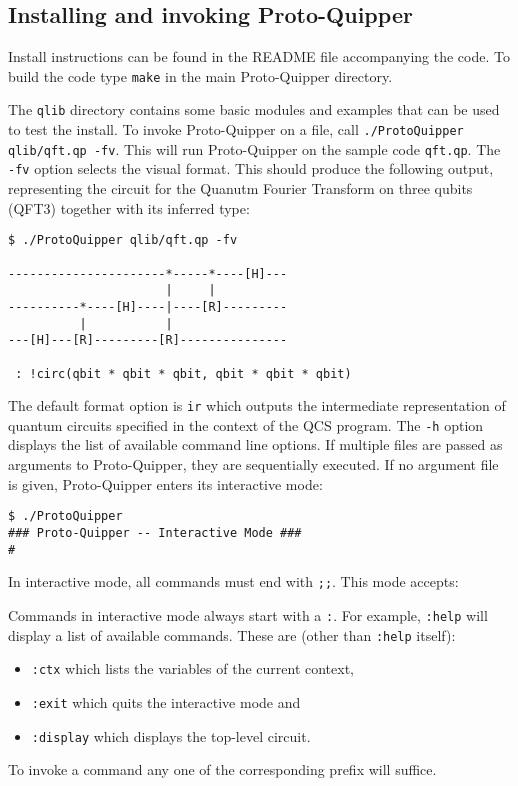 \subsection{Installing and invoking Proto-Quipper}

Install instructions can be found in the README file accompanying the code. 
To build the code type \verb#make# in the main Proto-Quipper directory. 

The \verb#qlib# directory contains some basic modules and examples that can 
be used to test the install. To invoke Proto-Quipper on a file, call 
\verb#./ProtoQuipper qlib/qft.qp -fv#. This will run Proto-Quipper on the sample code \verb#qft.qp#. The \verb#-fv# option selects the visual format. 
This should produce the following output, representing the circuit for the 
Quanutm Fourier Transform on three qubits (QFT3) together with its inferred 
type:
\begin{verbatim}
$ ./ProtoQuipper qlib/qft.qp -fv

----------------------*-----*----[H]---
                      |     |          
----------*----[H]----|----[R]---------
          |           |                
---[H]---[R]---------[R]---------------

 : !circ(qbit * qbit * qbit, qbit * qbit * qbit)
\end{verbatim}
The default format option is \verb#ir# which outputs the intermediate representation of quantum circuits specified in the context of the QCS program. The \verb#-h# option displays the list of available command line 
options. If multiple files are passed as arguments to Proto-Quipper, they 
are sequentially executed. If no argument file is given, Proto-Quipper 
enters its interactive mode:
\begin{verbatim}
$ ./ProtoQuipper
### Proto-Quipper -- Interactive Mode ###
# 
\end{verbatim}
In interactive mode, all commands must end with \verb#;;#. This mode accepts:
Commands in interactive mode always start with a \verb#:#. For example, 
\verb#:help# will display a list of available commands. These are (other 
than \verb#:help# itself): 
\begin{itemize}
  \item \verb#:ctx# which lists the variables of the current context, 
  \item \verb#:exit# which quits the interactive mode and
  \item \verb#:display# which displays the top-level circuit.
\end{itemize}
To invoke a command any one of the corresponding prefix will suffice.

